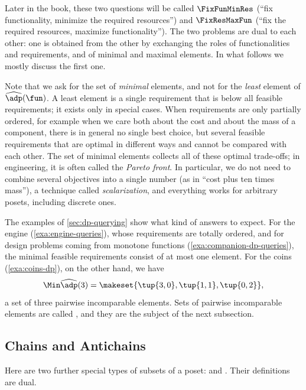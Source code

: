 Later in the book, these two questions will be called $\FixFunMinRes$ (``fix functionality, minimize the required resources'') and $\FixResMaxFun$ (``fix the required resources, maximize functionality'').
The two problems are dual to each other: one is obtained from the other by exchanging the roles of functionalities and requirements, and of minimal and maximal elements.
In what follows we mostly discuss the first one.

\begin{remark}
    \label{rem:minimal-vs-least}
    Note that we ask for the set of \emph{minimal} elements, and not for the \emph{least} element of $\widehat{\adp}(\fun)$.
    A least element is a single requirement that is below all feasible requirements; it exists only in special cases.
    When requirements are only partially ordered, for example when we care both about the cost and about the mass of a component, there is in general no single best choice, but several feasible requirements that are optimal in different ways and cannot be compared with each other.
    The set of minimal elements collects all of these optimal trade-offs; in engineering, it is often called the \emph{Pareto front}.
    In particular, we do not need to combine several objectives into a single number (as in ``cost plus ten times mass''), a technique called \emph{scalarization}, and everything works for arbitrary posets, including discrete ones.
\end{remark}

The examples of \cref{sec:dp-querying} show what kind of answers to expect.
For the engine (\cref{exa:engine-queries}), whose requirements are totally ordered, and for design problems coming from monotone functions (\cref{exa:companion-dp-queries}), the minimal feasible requirements consist of at most one element.
For the coins (\cref{exa:coins-dp}), on the other hand, we have
\begin{equation}
    \Min \widehat{\adp}(3) = \makeset{\tup{3, 0}, \tup{1, 1}, \tup{0, 2}},
\end{equation}
a set of three pairwise incomparable elements.
Sets of pairwise incomparable elements are called , and they are the subject of the next subsection.

\subsection{Chains and Antichains}
\label{sec:chains-antichains}


Here are two further special types of subsets of a poset:  and .
Their definitions are dual.

